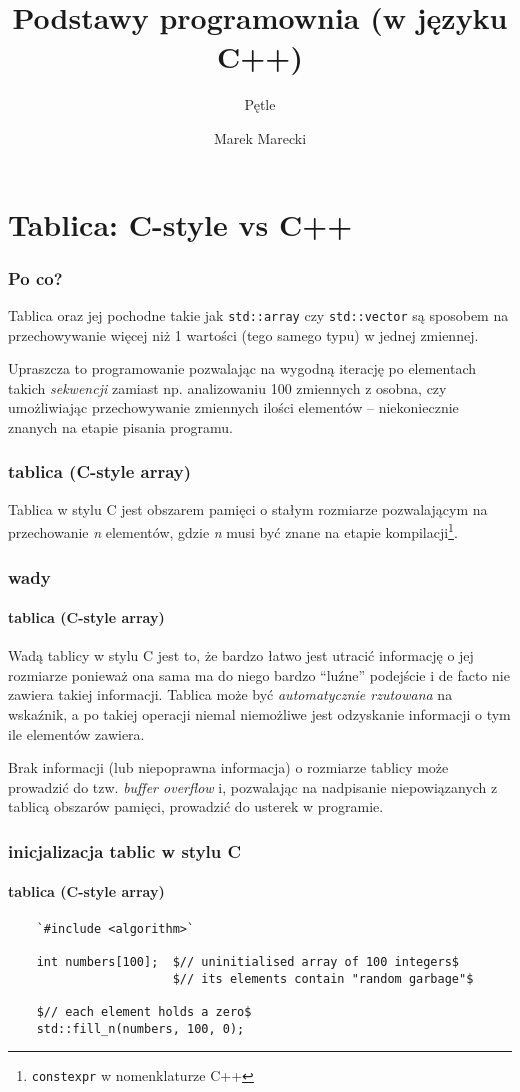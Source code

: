 \documentclass[aspectratio=169]{beamer}
\title{Podstawy programownia (w języku C++)}
\subtitle{Pętle}
\author{Marek Marecki}
\institute{Polsko-Japońska Akademia Technik Komputerowych}
\begin{document}
{%
    \frame{\titlepage}
}

\section{Tablica: C-style vs C++}

\begin{frame}
    \frametitle{Po co?}

    Tablica oraz jej pochodne takie jak {\tt std::array} czy {\tt std::vector}
    są sposobem na przechowywanie więcej niż 1 wartości (tego samego typu) w
    jednej zmiennej.

    \vspace{1em}

    Upraszcza to programowanie pozwalając na wygodną iterację po elementach
    takich \emph{sekwencji} zamiast np. analizowaniu 100 zmiennych z osobna, czy
    umożliwiając przechowywanie zmiennych ilości elementów -- niekoniecznie
    znanych na etapie pisania programu.
\end{frame}

\begin{frame}
    \frametitle{tablica (C-style array)}

    Tablica w stylu C jest obszarem pamięci o stałym rozmiarze pozwalającym na
    przechowanie \emph{n} elementów, gdzie \emph{n} musi być znane na etapie
    kompilacji\footnote{{\tt constexpr} w nomenklaturze C++}.
\end{frame}

\begin{frame}
    \frametitle{wady}
    \framesubtitle{tablica (C-style array)}

    Wadą tablicy w stylu C jest to, że bardzo łatwo jest utracić informację o
    jej rozmiarze ponieważ ona sama ma do niego bardzo ``luźne'' podejście i de
    facto nie zawiera takiej informacji.
    Tablica może być \emph{automatycznie rzutowana} na wskaźnik, a po takiej
    operacji niemal niemożliwe jest odzyskanie informacji o tym ile elementów
    zawiera.

    \vspace{1em}

    Brak informacji (lub niepoprawna informacja) o rozmiarze tablicy może
    prowadzić do tzw. \emph{buffer overflow} i, pozwalając na nadpisanie
    niepowiązanych z tablicą obszarów pamięci, prowadzić do usterek w
    programie.
\end{frame}

\begin{frame}[fragile]
    \frametitle{inicjalizacja tablic w stylu C}
    \framesubtitle{tablica (C-style array)}

    {\footnotesize
    \begin{lstlisting}
    `#include <algorithm>`

    int numbers[100];  $// uninitialised array of 100 integers$
                       $// its elements contain "random garbage"$

    $// each element holds a zero$
    std::fill_n(numbers, 100, 0);
    \end{lstlisting}}
\end{frame}
\end{document}
